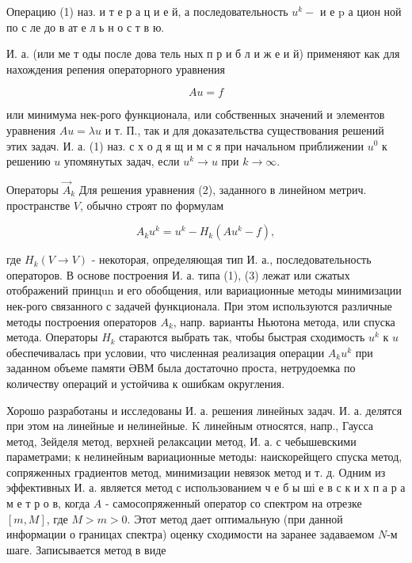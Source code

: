 \documentclass[10pt]{article}
\begin{document}
Операцию (1) наз. и т е р а ц и е й, а последовательность $u^{k}-$ и е $\mathrm{p}$ а цион ной по с ле до в ат е л ь н о с т в ю.



И. а. (или ме т оды после дова тель ных п р и б л и ж е и й) применяют как для нахождения репения операторного уравнения



\[

A u=f

\]



или минимума нек-рого функционала, или собственных значений и элементов уравнения $A u=\lambda u$ и т. П., так и для доказательства существования решений этих задач. И. а. (1) наз. с х о д я щ и м с я при начальном приближении $u^{0}$ к решению $u$ упомянутых задач, если $u^{k} \rightarrow u$ при $k \rightarrow \infty$.



Операторы $\vec{A}_{k}$ Для решения уравнения (2), заданного в линейном метрич. пространстве $V$, обычно строят по формулам



\[

A_{k} u^{k}=u^{k}-H_{k}\left(A u^{k}-f\right),

\]



где $H_{k}(V \rightarrow V)$ - некоторая, определяющая тип И. а., последовательность операторов. В основе построения И. а. типа (1), (3) лежат или сжатых отображений принцun и его обобщения, или вариационные методы минимизации нек-рого связанного с задачей функционала. При этом используются различные методы построения операторов $A_{k}$, напр. варианты Ньютона метода, или спуска метода. Операторы $H_{k}$ стараются выбрать так, чтобы быстрая сходимость $u^{k}$ к $u$ обеспечивалась при условии, что численная реализация операции $A_{k} u^{k}$ при заданном объеме памяти ӘВМ была достаточно проста, нетрудоемка по количеству операций и устойчива к ошибкам округления.



Хорошо разработаны и исследованы И. а. решения линейных задач. И. а. делятся при этом на линейные и нелинейные. $\mathrm{K}$ линейным относятся, напр., Гаусса метод, Зейделя метод, верхней релаксации метод, И. а. с чебышевскими параметрами; к нелинейным вариационные методы: наискорейщего спуска метод, сопряженных градиентов метод, минимизации невязок метод и т. д. Одним из эффективных И. а. является метод с использованием ч е б ы ші е в с к и х п а р а м е т р о в, когда $A$ - самосопряженный оператор со спектром на отрезке $[m, M]$, где $M>m>0$. Этот метод дает оптимальную (при данной информации о границах спектра) оценку сходимости на заранее задаваемом $N$-м шаге. Записывается метод в виде
\end{document}
